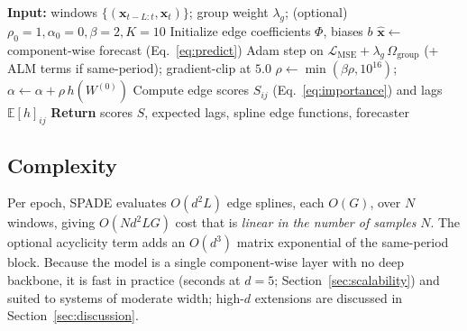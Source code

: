 \begin{algorithm}[t]
\caption{SPADE training}
\label{alg:cdkan}
\begin{algorithmic}[1]
\STATE \textbf{Input:} windows $\{(\mathbf{x}_{t-L:t},\mathbf{x}_t)\}$; group weight $\lambda_g$; (optional) $\rho_0{=}1,\alpha_0{=}0,\beta{=}2,K{=}10$
\STATE Initialize edge coefficients $\Phi$, biases $b$
    \STATE $\hat{\mathbf{x}} \leftarrow$ component-wise forecast (Eq.~\ref{eq:predict})
    \STATE Adam step on $\mathcal{L}_{\mathrm{MSE}}+\lambda_g\,\Omega_{\mathrm{group}}$ (+ ALM terms if same-period); gradient-clip at $5.0$
        \STATE $\rho \leftarrow \min(\beta\rho,10^{16})$;\quad $\alpha \leftarrow \alpha + \rho\,h(W^{(0)})$
    \ENDIF
\ENDFOR
\STATE Compute edge scores $S_{ij}$ (Eq.~\ref{eq:importance}) and lags $\mathbb{E}[h]_{ij}$
\STATE \textbf{Return} scores $S$, expected lags, spline edge functions, forecaster
\end{algorithmic}
\end{algorithm}

\subsection{Complexity}
\label{sec:complexity}
Per epoch, SPADE evaluates $O(d^2 L)$ edge splines, each $O(G)$, over $N$ windows,
giving $O(N d^2 L G)$ cost that is \emph{linear in the number of samples} $N$. The
optional acyclicity term adds an $O(d^3)$ matrix exponential of the same-period
block. Because the model is a single component-wise layer with no deep backbone,
it is fast in practice (seconds at $d{=}5$; Section~\ref{sec:scalability}) and
suited to systems of moderate width; high-$d$ extensions are discussed in
Section~\ref{sec:discussion}.

